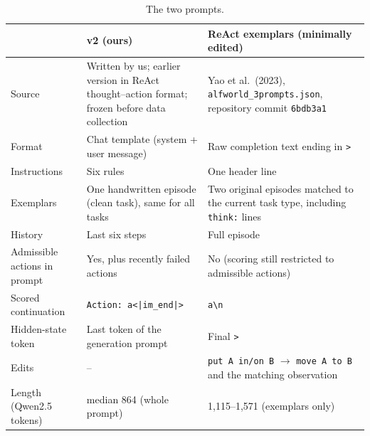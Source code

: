 \documentclass[11pt]{article}
\newcommand{\code}[1]{\texttt{#1}}
\begin{document}
\begin{table}[h]
\centering\small
\caption{The two prompts.}\label{tab:a4}
\begin{tabularx}{\linewidth}{@{}lLL@{}}
\toprule
 & v2 (ours) & ReAct exemplars (minimally edited) \\
\midrule
Source & Written by us; earlier version in ReAct thought--action format; frozen before data collection & Yao et al.\ (2023), \code{alfworld\_3prompts.json}, repository commit \code{6bdb3a1} \\
Format & Chat template (system + user message) & Raw completion text ending in \code{>} \\
Instructions & Six rules & One header line \\
Exemplars & One handwritten episode (clean task), same for all tasks & Two original episodes matched to the current task type, including \code{think:} lines \\
History & Last six steps & Full episode \\
Admissible actions in prompt & Yes, plus recently failed actions & No (scoring still restricted to admissible actions) \\
Scored continuation & \code{Action: a<|im\_end|>} & \code{\textvisiblespace a\textbackslash n} \\
Hidden-state token & Last token of the generation prompt & Final \code{>} \\
Edits & -- & \code{put A in/on B} $\rightarrow$ \code{move A to B} and the matching observation \\
Length (Qwen2.5 tokens) & median 864 (whole prompt) & 1,115--1,571 (exemplars only) \\
\bottomrule
\end{tabularx}
\end{table}
\end{document}
